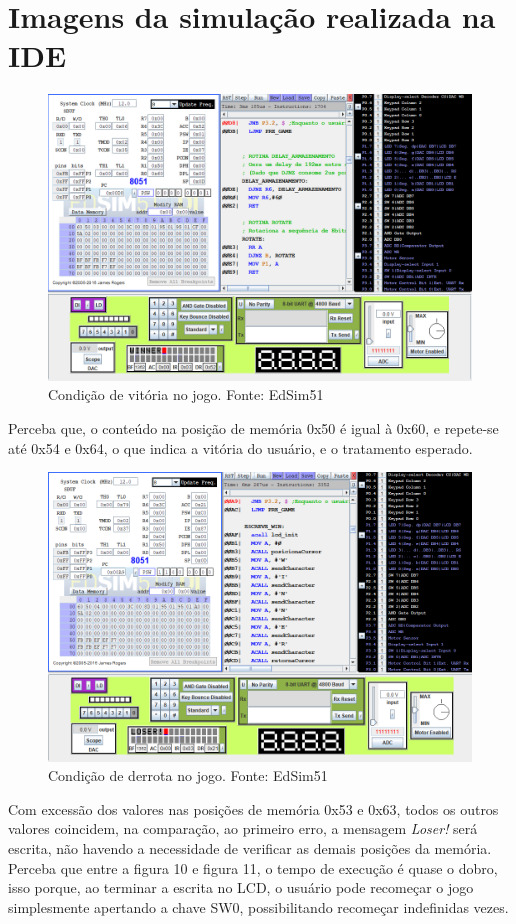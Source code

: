 \documentclass{article}
\begin{document}
\section{Imagens da simulação realizada na IDE}
\begin{figure}[H]
\hspace*{-2in}
\includegraphics[scale=0.8]{vitoria.PNG}
\caption{Condição de vitória no jogo. Fonte: EdSim51}
\end{figure}
Perceba que, o conteúdo na posição de memória 0x50 é igual à 0x60, e repete-se até 0x54 e 0x64, o que indica a vitória do usuário, e o tratamento esperado.
\begin{figure}[H]
\hspace*{-2in}
\includegraphics[scale=0.8]{perdeu.PNG}
\caption{Condição de derrota no jogo. Fonte: EdSim51}
\end{figure}
Com excessão dos valores nas posições de memória 0x53 e 0x63, todos os outros valores coincidem, na comparação, ao primeiro erro, a mensagem \textit{Loser!} será escrita, não havendo a necessidade de verificar as demais posições da memória.\newline
Perceba que entre a figura 10 e figura 11, o tempo de execução é quase o dobro, isso porque, ao terminar a escrita no LCD, o usuário pode recomeçar o jogo simplesmente apertando a chave SW0, possibilitando recomeçar indefinidas vezes.
\end{document}
